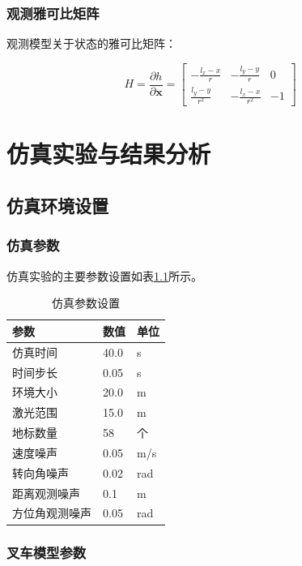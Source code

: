 \documentclass[12pt,a4paper]{report}
\begin{document}
\subsection{观测雅可比矩阵}

观测模型关于状态的雅可比矩阵：

\begin{equation}
H = \frac{\partial h}{\partial \mathbf{x}} = 
\begin{bmatrix}
-\frac{l_x - x}{r} & -\frac{l_y - y}{r} & 0 \\
\frac{l_y - y}{r^2} & -\frac{l_x - x}{r^2} & -1
\end{bmatrix}
\end{equation}

\chapter{仿真实验与结果分析}

\section{仿真环境设置}

\subsection{仿真参数}

仿真实验的主要参数设置如表\ref{tab:sim_params}所示。

\begin{table}[H]
\centering
\caption{仿真参数设置}
\label{tab:sim_params}
\begin{tabular}{lll}
\toprule
\textbf{参数} & \textbf{数值} & \textbf{单位} \\
\midrule
仿真时间 & 40.0 & s \\
时间步长 & 0.05 & s \\
环境大小 & 20.0 & m \\
激光范围 & 15.0 & m \\
地标数量 & 58 & 个 \\
速度噪声 & 0.05 & m/s \\
转向角噪声 & 0.02 & rad \\
距离观测噪声 & 0.1 & m \\
方位角观测噪声 & 0.05 & rad \\
\bottomrule
\end{tabular}
\end{table}

\subsection{叉车模型参数}
\end{document}
